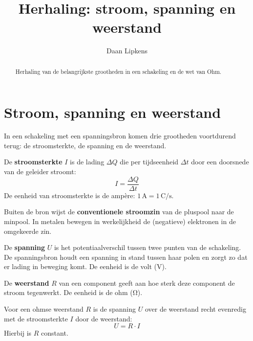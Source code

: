 \documentclass{ximera}
\title{Herhaling: stroom, spanning en weerstand}
\author{Daan Lipkens}
\begin{document}
\begin{abstract}
    Herhaling van de belangrijkste grootheden in een schakeling en de wet van Ohm.
\end{abstract}
\maketitle
\label{ond:schakelingen_herhaling}

\section{Stroom, spanning en weerstand}\label{sec:herhaling-ohm}
In een schakeling met een spanningsbron komen drie grootheden voortdurend terug: de stroomsterkte, de spanning en de weerstand.

\begin{definition}[foldable=true,title={Stroomsterkte}]\nl
    De \textbf{stroomsterkte} $I$ is de lading $\Delta Q$ die per tijdseenheid $\Delta t$ door een doorsnede van de geleider stroomt:
    \begin{equation*}
        I = \frac{\Delta Q}{\Delta t}
    \end{equation*}
    De eenheid van stroomsterkte is de ampère: $1\,\mathrm{A} = 1\,\mathrm{C/s}$.
\end{definition}

\begin{remark}[foldable=true,title={Conventionele stroomzin}]\nl
    Buiten de bron wijst de \textbf{conventionele stroomzin} van de pluspool naar de minpool. In metalen bewegen in werkelijkheid de (negatieve) elektronen in de omgekeerde zin.
\end{remark}

\begin{definition}[foldable=true,title={Spanning}]\nl
    De \textbf{spanning} $U$ is het potentiaalverschil tussen twee punten van de schakeling. De spanningsbron houdt een spanning in stand tussen haar polen en zorgt zo dat er lading in beweging komt. De eenheid is de volt ($\mathrm{V}$).
\end{definition}

\begin{definition}[foldable=true,title={Weerstand}]\nl
    De \textbf{weerstand} $R$ van een component geeft aan hoe sterk deze component de stroom tegenwerkt. De eenheid is de ohm ($\mathrm{\Omega}$).
\end{definition}

\begin{proposition}[title={Wet van Ohm}]\nl
    Voor een ohmse weerstand $R$ is de spanning $U$ over de weerstand recht evenredig met de stroomsterkte $I$ door de weerstand:
    \begin{equation*}
        U = R \cdot I
    \end{equation*}
    Hierbij is $R$ constant.
\end{proposition}
\end{document}
